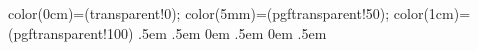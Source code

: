     {\pgfpointorigin}
    {
        color(0cm)=(transparent!0);
        color(5mm)=(pgftransparent!50);
        color(1cm)=(pgftransparent!100)
    }
    {}
    {\topsep}               %
    {\topsep}               %
    {}                      %
    {}                      %
    {\bfseries}             %
    {}                      %
    {.5em}                  %
    {}
    {\topsep}               %
    {\topsep}               %
    {\itshape}              %
    {}                      %
    {\bfseries}             %
    {}                      %
    {.5em}                  %
    {}              
    {0em}                   %
    {\topsep}               %
    {}                      %
    {}                      %
    {\bfseries}             %
    {}                      %
    {.5em}                  %
    {}
    {0em}                   %
    {\topsep}               %
    {\itshape}              %
    {}                      %
    {\bfseries}             %
    {}                      %
    {.5em}                  %
    {}
